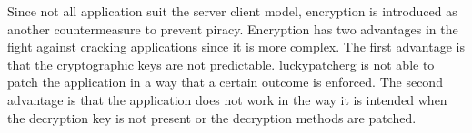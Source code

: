 Since not all application suit the server client model, encryption is introduced as another countermeasure to prevent piracy.
Encryption has two advantages in the fight against cracking applications since it is more complex.
The first advantage is that the cryptographic keys are not predictable.
\gls{luckypatcherg} is not able to patch the application in a way that a certain outcome is enforced.
The second advantage is that the application does not work in the way it is intended when the decryption key is not present or the decryption methods are patched.
